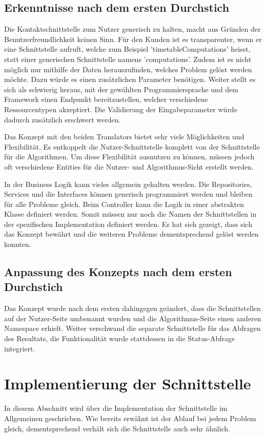 \subsection{Erkenntnisse nach dem ersten Durchstich}\label{learning_prototyp}
Die Kontaktschnittstelle zum Nutzer generisch zu halten, macht aus Gründen der Benutzerfreundlichkeit keinen Sinn. Für den Kunden ist es transparenter, wenn er eine Schnittstelle aufruft, 
welche zum Beispiel 'timetableComputations' heisst, statt einer generischen Schnittstelle namens 'computations'. Zudem ist es nicht möglich nur mithilfe der Daten herauszufinden, welches 
Problem gelöst werden möchte. Dazu würde es einen zusätzlichen Parameter benötigen. Weiter stellt es sich als schwierig heraus, mit der gewählten Programmiersprache und dem Framework 
einen Endpunkt bereitzustellen, welcher verschiedene Ressourcentypen akzeptiert. Die Validierung der Eingabeparameter würde dadurch zusätzlich erschwert werden.

Das Konzept mit den beiden Translators bietet sehr viele Möglichkeiten und Flexibilität. Es entkoppelt die Nutzer-Schnittstelle komplett von der Schnittstelle für die Algorithmen. Um diese 
Flexibilität ausnutzen zu können, müssen jedoch oft verschiedene Entities für die Nutzer- und Algorithmus-Sicht erstellt werden.

In der Business Logik kann vieles allgemein gehalten werden. Die Repositories, Services und die Interfaces können generisch programmiert werden und bleiben für alle Probleme gleich. Beim 
Controller kann die Logik in einer abstrakten Klasse definiert werden. Somit müssen nur noch die Namen der Schnittstellen in der spezifischen Implementation definiert werden. Es hat sich 
gezeigt, dass sich das Konzept bewährt und die weiteren Probleme dementsprechend gelöst werden konnten.

\subsection{Anpassung des Konzepts nach dem ersten Durchstich}\label{doings_prototyp}
Das Konzept wurde nach dem ersten  dahingegen geändert, dass die Schnittstellen auf der Nutzer-Seite umbenannt wurden und die 
Algorithmus-Seite einen anderen Namespace erhielt. Weiter verschwand die separate Schnittstelle für das Abfragen des Resultats, die Funktionalität wurde stattdessen in die Status-Abfrage 
integriert.

\section{Implementierung der Schnittstelle}\label{impl_interface}
In diesem Abschnitt wird über die Implementation der Schnittstelle im Allgemeinen geschrieben. Wie bereits erwähnt ist der Ablauf bei jedem Problem gleich, dementsprechend verhält sich die 
Schnittstelle auch sehr ähnlich.


